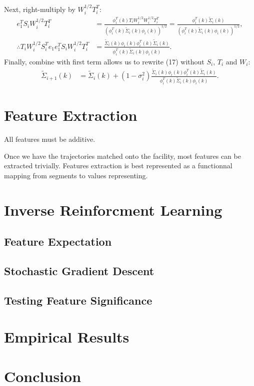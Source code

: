 \documentclass{article}
\begin{document}
Next, right-multiply by $W_i^{1/2} T_i^T$:
$$
\begin{align}
  e_1^T S_i W_i^{1/2} T_i^T & =
    \frac{\phi_i^T(k) T_i W_i^{1/2} W_i^{1/2} T_i^T}
    {(\phi_i^T(k) \tilde{\Sigma}_i(k) \phi_i(k))^{1/2}}
  = \frac{\phi_i^T(k) \tilde{\Sigma}_i(k)}
    {(\phi_i^T(k) \tilde{\Sigma}_i(k) \phi_i(k))^{1/2}}, \\
  \therefore T_i W_i^{1/2} S_i^T e_1 e_1^T S_i W_i^{1/2} T_i^T & =
    \frac{\tilde{\Sigma}_i(k) \phi_i(k) \phi_i^T(k) \tilde{\Sigma}_i(k)}
    {\phi_i^T(k) \tilde{\Sigma}_i(k) \phi_i(k)}.
\end{align}
$$
Finally, combine with first term allows us to rewrite (17) without $S_i$, $T_i$ and $W_i$:
$$
\begin{align}
\tilde{\Sigma}_{i+1}(k) &  =
  \tilde{\Sigma}_i(k) + (1 - \sigma_i^2)
    \frac{\tilde{\Sigma}_i(k) \phi_i(k) \phi_i^T(k) \tilde{\Sigma}_i(k)}
    {\phi_i^T(k) \tilde{\Sigma}_i(k) \phi_i(k)}.
\end{align}
$$

\section{Feature Extraction}\label{Sec:Features}

All features must be additive.

Once we have the trajectories matched onto the facility, most features can be
extracted trivially. 
Features extraction is best represented as a functionnal 
mapping from segments to values representing.

\section{Inverse Reinforcment Learning}\label{Sec:IRL}

\subsection{Feature Expectation}\label{Sec:IRL}

\subsection{Stochastic Gradient Descent}\label{Sec:SGD}

\subsection{Testing Feature Significance}\label{Sec:SGD}

\section{Empirical Results}\label{Sec:Result}

\section{Conclusion}\label{Sec:Conclu}

{}

\end{document}
